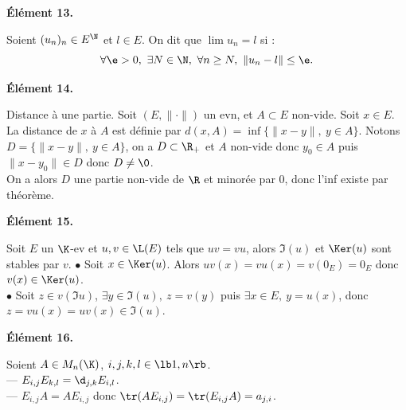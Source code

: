 \documentclass[11pt]{article}
\begin{document}
\begin{center}
    \bf{Élément 13.}
\end{center}

\begin{defi}{}{}
    Soient $(u_n)_n \in E^\N$ et $l\in E$. On dit que $\lim u_n = l$ si :
    \begin{equation*}
        \forall \e > 0, ~ \exists N \in \N, ~ \forall n \geq N, ~ \|u_n - l\| \leq \e.
    \end{equation*}
\end{defi}

\begin{center}
    \bf{Élément 14.}
\end{center}

\begin{defi}{Distance à une partie.}{}
    Soit $(E,\|\cdot\|)$ un evn, et $A\subset E$ non-vide. Soit $x\in E$.\\
    La distance de $x$ à $A$ est définie par $d(x,A)=\inf\{\|x-y\|, ~ y \in A\}$.
    \tcblower
    Notons $D=\{\|x-y\|, ~ y \in A\}$, on a $D\subset\R_+$ et $A$ non-vide donc $y_0\in A$ puis $\|x-y_0\|\in D$ donc $D\neq\0$.\\
    On a alors $D$ une partie non-vide de $\R$ et minorée par 0, donc l'inf existe par théorème. 
\end{defi}

\pagebreak

\begin{center}
    \bf{Élément 15.}
\end{center}

\begin{prop}{ }{}
    Soit $E$ un $\K$-ev et $u,v\in\L(E)$ tels que $uv=vu$, alors $\Im(u)$ et $\Ker(u)$ sont stables par $v$.
    \tcblower
    $\bullet$ Soit $x\in\Ker(u)$. Alors $uv(x)=vu(x)=v(0_E)=0_E$ donc $v(x)\in\Ker(u)$.\\
    $\bullet$ Soit $z\in v(\Im u)$, $\exists y \in \Im(u), ~ z=v(y)$ puis $\exists x \in E, ~ y=u(x)$, donc $z=vu(x)=uv(x)\in\Im(u)$.
\end{prop}

\begin{center}
    \bf{Élément 16.}
\end{center}

\begin{ex}{}{}
    Soient $A\in M_n(\K)$, $i,j,k,l\in\lb1,n\rb$.\\
    --- $E_{i,j}E_{k,l}=\d_{j,k}E_{i,l}$.\\
    --- $E_{i,j}A=AE_{i,j}$ donc $\tr(AE_{i,j})=\tr(E_{i,j}A)=a_{j,i}$.
\end{ex}
\end{document}
